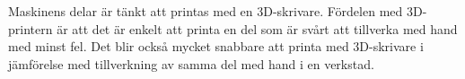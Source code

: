 Maskinens delar är tänkt att printas med en 3D-skrivare. Fördelen med 3D-printern är att det är enkelt att printa en del som är svårt att tillverka med hand med minst fel. Det blir också mycket snabbare att printa med 3D-skrivare i jämförelse med tillverkning av samma del med hand i en verkstad. 